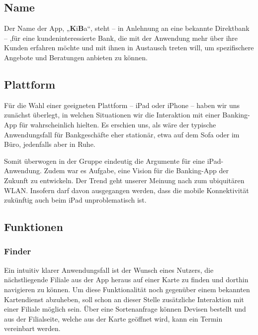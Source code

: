 \subsection{Name}
    Der Name der App, „\textbf{K}i\textbf{B}a“, steht – in Anlehnung an eine bekannte Direktbank – ,für eine kundeninteressierte Bank, die mit der Anwendung mehr über ihre Kunden erfahren möchte und mit ihnen in Austausch treten will, um spezifischere Angebote und Beratungen anbieten zu können.
    
\subsection{Plattform}
    Für die Wahl einer geeigneten Plattform – iPad oder iPhone – haben wir uns zunächst überlegt, in welchen Situationen wir die Interaktion mit einer Banking-App für wahrscheinlich hielten. Es erschien uns, als wäre der typische Anwendungsfall für Bankgeschäfte eher stationär, etwa auf dem Sofa oder im Büro, jedenfalls aber in Ruhe.     
    
    Somit überwogen in der Gruppe eindeutig die Argumente für eine iPad-Anwendung. Zudem war es Aufgabe, eine Vision für die Banking-App der Zukunft zu entwickeln. Der Trend geht unserer Meinung nach zum ubiquitären WLAN. Insofern darf davon ausgegangen werden, dass die mobile Konnektivität zukünftig auch beim iPad unproblematisch ist.
    
\subsection{Funktionen}
\subsubsection{Finder}
	Ein intuitiv klarer Anwendungsfall ist der Wunsch eines Nutzers, die nächstliegende Filiale aus der App heraus auf einer Karte zu finden und dorthin navigieren zu können. Um diese Funktionalität noch gegenüber einem bekannten Kartendienst abzuheben, soll schon an dieser Stelle zusätzliche Interaktion mit einer Filiale möglich sein. Über eine Sortenanfrage können Devisen bestellt und aus der Filialseite, welche aus der Karte geöffnet wird, kann ein Termin vereinbart werden.

